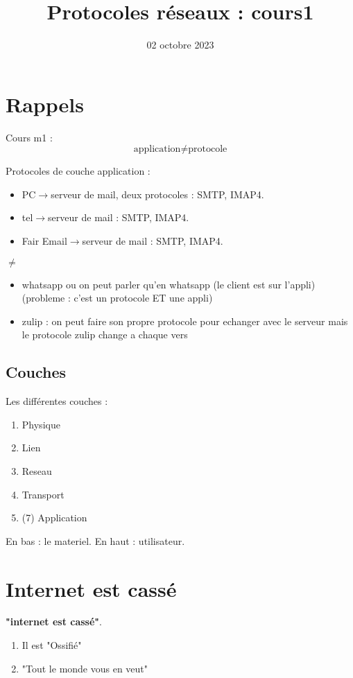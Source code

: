 \documentclass[12pt]{article}
\title{Protocoles réseaux : cours1}
\date{02 octobre 2023}
\theoremstyle{plain}
\theoremstyle{definition}
\theoremstyle{remark}
\begin{document}
\maketitle

\section{Rappels}
Cours m1 :
$$\text{application}\ne\text{protocole}$$

Protocoles de couche application :
\begin{itemize}
    \item PC$\rightarrow$serveur de mail, deux protocoles : SMTP, IMAP4.
    \item tel$\rightarrow$serveur de mail : SMTP, IMAP4.
    \item Fair Email$\rightarrow$serveur de mail : SMTP, IMAP4.
\end{itemize}

$\ne$
\begin{itemize}
    \item whatsapp ou on peut parler qu'en whatsapp (le client est sur l'appli)(probleme : c'est un protocole ET une appli)
    \item zulip : on peut faire son propre protocole pour echanger avec le serveur mais le protocole zulip change a chaque vers
\end{itemize}

\subsection{Couches}
Les différentes couches :
\begin{enumerate}
    \item Physique
    \item Lien
    \item Reseau
    \item Transport
    \item (7) Application
\end{enumerate}

En bas : le materiel. En haut : utilisateur.\\
\section{Internet est cassé}
\begin{center}
    \textbf{ "internet est cassé"}.
\end{center}
\begin{enumerate}
    \item Il est "Ossifié"
    \item "Tout le monde vous en veut"
\end{enumerate}
\end{document}
